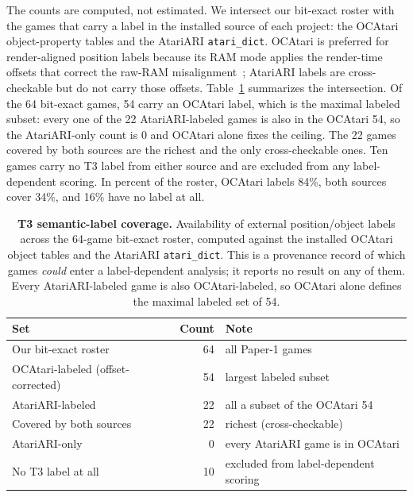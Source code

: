 The counts are computed, not estimated. We intersect our bit-exact roster with the games that
carry a label in the installed source of each project: the OCAtari object-property tables and the
AtariARI \texttt{atari\_dict}. OCAtari is preferred for render-aligned position labels because its
RAM mode applies the render-time offsets that correct the raw-RAM misalignment~\cite{delfosse2023ocatari};
AtariARI labels are cross-checkable but do not carry those offsets. Table~\ref{supp:tab:t3coverage}
summarizes the intersection. Of the 64 bit-exact games, 54 carry an OCAtari label, which is the
maximal labeled subset: every one of the 22 AtariARI-labeled games is also in the OCAtari 54, so
the AtariARI-only count is $0$ and OCAtari alone fixes the ceiling. The 22 games covered by both
sources are the richest and the only cross-checkable ones. Ten games carry no T3 label from either
source and are excluded from any label-dependent scoring. In percent of the roster, OCAtari labels
84\%, both sources cover 34\%, and 16\% have no label at all.

\begin{table}[t]
\centering
\caption{\textbf{T3 semantic-label coverage.} Availability of external position/object labels
across the 64-game bit-exact roster, computed against the installed OCAtari object tables and the
AtariARI \texttt{atari\_dict}. This is a provenance record of which games \emph{could} enter a
label-dependent analysis; it reports no result on any of them. Every AtariARI-labeled game is also
OCAtari-labeled, so OCAtari alone defines the maximal labeled set of 54.}
\label{supp:tab:t3coverage}
\footnotesize
\setlength{\tabcolsep}{5pt}
\begin{tabular}{@{}p{6.4cm}rp{4.2cm}@{}}
\toprule
Set & Count & Note \\
\midrule
Our bit-exact roster & 64 & all Paper-1 games \\
OCAtari-labeled (offset-corrected) & 54 & largest labeled subset \\
AtariARI-labeled & 22 & all a subset of the OCAtari 54 \\
Covered by both sources & 22 & richest (cross-checkable) \\
AtariARI-only & 0 & every AtariARI game is in OCAtari \\
No T3 label at all & 10 & excluded from label-dependent scoring \\
\bottomrule
\end{tabular}
\end{table}

